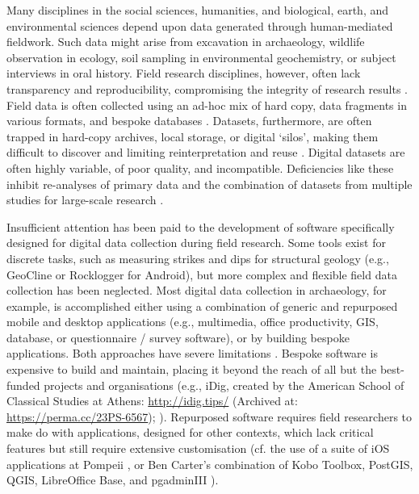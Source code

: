 \documentclass[preprint,12pt, a4paper]{elsarticle}
\begin{document}
Many disciplines in the social sciences, humanities, and biological, earth, and environmental sciences depend upon data generated through human-mediated fieldwork. Such data might arise from excavation in archaeology, wildlife observation in ecology, soil sampling in environmental geochemistry, or subject interviews in oral history. Field research disciplines, however, often lack transparency and reproducibility, compromising the integrity of research results \cite{McNutt2016-dg}. Field data is often collected using an ad-hoc mix of hard copy, data fragments in various formats, and bespoke databases \cite{Borgman2015-zg, Kansa2010-qx, Kintigh2006-uf, Snow2006-nu}. Datasets, furthermore, are often trapped in hard-copy archives, local storage, or digital `silos', making them difficult to discover and limiting reinterpretation and reuse \cite{Blanke2010-ou}. Digital datasets are often highly variable, of poor quality, and incompatible. Deficiencies like these inhibit re-analyses of primary data and the combination of datasets from multiple studies for large-scale research \cite{Kintigh2006-uf, Kintigh2014-ks, McNutt2016-dg}. 

Insufficient attention has been paid to the development of software specifically designed for digital data collection during field research. Some tools exist for discrete tasks, such as measuring strikes and dips for structural geology (e.g., GeoCline or Rocklogger for Android), but more complex and flexible field data collection has been neglected. Most digital data collection in archaeology, for example, is accomplished either using a combination of generic and repurposed mobile and desktop applications (e.g., multimedia, office productivity, GIS, database, or questionnaire / survey software), or by building bespoke applications. Both approaches have severe limitations \cite{Sobotkova2016-mx}. Bespoke software is expensive to build and maintain, placing it beyond the reach of all but the best-funded projects and organisations (e.g., iDig, created by the American School of Classical Studies at Athens: \url{http://idig.tips/} (Archived at: \url{https://perma.cc/23PS-6567}); \cite{Fee2016-nn}). Repurposed software requires field researchers to make do with applications, designed for other contexts, which lack critical features but still require extensive customisation (cf. the use of a suite of iOS applications at Pompeii \cite{Ellis2016-vh}, or Ben Carter's combination of Kobo Toolbox, PostGIS, QGIS, LibreOffice Base, and pgadminIII \cite{Carter2016-jm}). 
\end{document}

